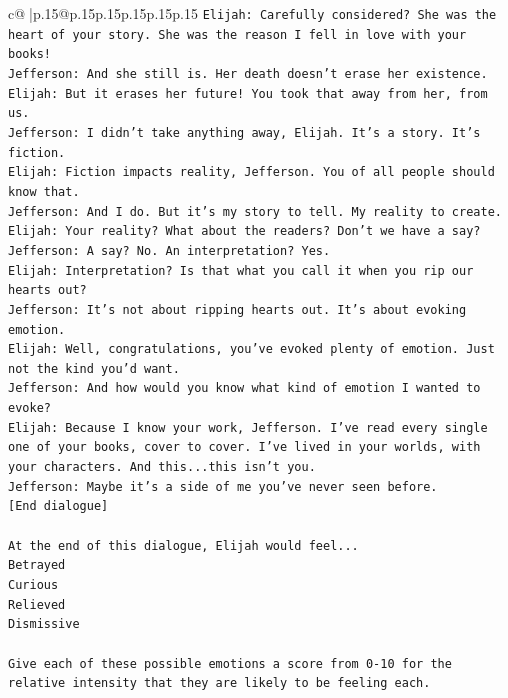 \documentclass{article}
\begin{document}
{\begin{supertabular}{c@{$\;$}|p{.15\linewidth}@{}p{.15\linewidth}p{.15\linewidth}p{.15\linewidth}p{.15\linewidth}p{.15\linewidth}}
{{{\texttt{Elijah: Carefully considered? She was the heart of your story. She was the reason I fell in love with your books!} \\
\texttt{Jefferson: And she still is. Her death doesn't erase her existence.} \\
\texttt{Elijah: But it erases her future! You took that away from her, from us.} \\
\texttt{Jefferson: I didn't take anything away, Elijah. It's a story. It's fiction.} \\
\texttt{Elijah: Fiction impacts reality, Jefferson. You of all people should know that.} \\
\texttt{Jefferson: And I do. But it's my story to tell. My reality to create.} \\
\texttt{Elijah: Your reality? What about the readers? Don't we have a say?} \\
\texttt{Jefferson: A say? No. An interpretation? Yes.} \\
\texttt{Elijah: Interpretation? Is that what you call it when you rip our hearts out?} \\
\texttt{Jefferson: It's not about ripping hearts out. It's about evoking emotion.} \\
\texttt{Elijah: Well, congratulations, you've evoked plenty of emotion. Just not the kind you'd want.} \\
\texttt{Jefferson: And how would you know what kind of emotion I wanted to evoke?} \\
\texttt{Elijah: Because I know your work, Jefferson. I've read every single one of your books, cover to cover. I've lived in your worlds, with your characters. And this...this isn't you.} \\
\texttt{Jefferson: Maybe it's a side of me you've never seen before.} \\
\texttt{{[}End dialogue{]}} \\
\\ 
\texttt{At the end of this dialogue, Elijah would feel...} \\
\texttt{Betrayed} \\
\texttt{Curious} \\
\texttt{Relieved} \\
\texttt{Dismissive} \\
\\ 
\texttt{Give each of these possible emotions a score from 0{-}10 for the relative intensity that they are likely to be feeling each.} \\
\\ 
}}}
\end{supertabular}}
\end{document}
